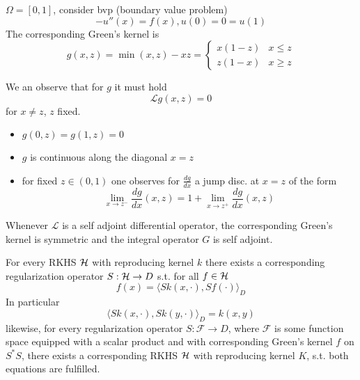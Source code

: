 \begin{example}
    $\Omega=[0,1]$, consider bvp (boundary value problem)
    \[-u''(x)=f(x),u(0)=0=u(1)\]
    The corresponding Green's kernel is 
    \[g(x,z)=\min(x,z)-xz=\begin{cases}
        x(1-z) & x\leq z\\
        z(1-x) & x\geq z
    \end{cases}\]

    We an observe that for $g$ it must hold
    \[\mathcal{L}g(x,z)=0\] for $x\neq z$, $z$ fixed. 
    \begin{itemize}
        \item $g(0,z)=g(1,z)=0$
        \item $g$ is continuous along the diagonal $x=z$
        \item for fixed $z\in (0,1)$ one observes for $\frac{dg}{dx}$ a jump disc. at $x=z$ of the form 
        \[\lim_{x\to z^-}\frac{dg}{dx}(x,z)=1+\lim_{x\to z^+}\frac{dg}{dx}(x,z)\]
    \end{itemize} 
\end{example}

\begin{remark}
    Whenever $\mathcal{L}$ is a self adjoint differential operator, 
    the corresponding Green's kernel is symmetric and the integral operator $G$ is 
    self adjoint. 
\end{remark}

\begin{theorem}\label{thm:50}
    For every RKHS $\mathcal{H}$ with reproducing kernel $k$ there exists a corresponding regularization operator 
    $S:\mathcal{H}\to D$ s.t. for all $f\in\mathcal{H}$
    \begin{equation}\label{eq:010}
        f(x)=\langle Sk(x,\cdot),Sf(\cdot)\rangle_D
    \end{equation}
    In particular \[\langle S k(x,\cdot),Sk(y,\cdot)\rangle_D=k(x,y)\]
    likewise, for every regularization operator $S:\mathcal{F}\to D$, where $\mathcal{F}$ is some 
    function space equipped with a scalar product and with corresponding Green's kernel 
    $f$ on $S^*S$, %
    there exists a corresponding RKHS $\mathcal{H}$ with reproducing kernel $K$, s.t.
    both equations are fulfilled.
\end{theorem}

